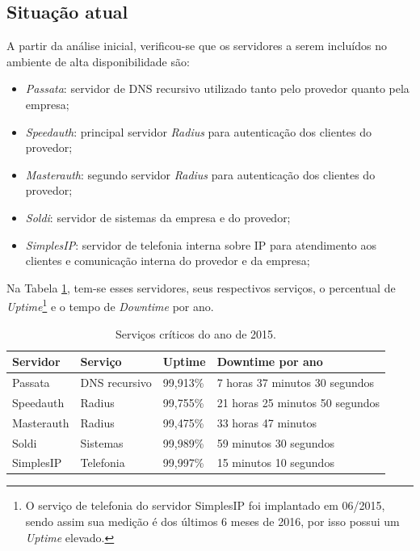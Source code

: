 \subsection{Situação atual}
\label{section:maqservcrit}

A partir da análise inicial, verificou-se que os servidores a serem incluídos no ambiente de alta disponibilidade são:
\begin{itemize}
 \item \textit{Passata}: servidor de \ac{DNS} recursivo utilizado tanto pelo provedor quanto pela empresa;
 \item \textit{Speedauth}: principal servidor \textit{Radius} para autenticação dos clientes do provedor;
 \item \textit{Masterauth}: segundo servidor \textit{Radius} para autenticação dos clientes do provedor;
 \item \textit{Soldi}: servidor de sistemas da empresa e do provedor;
 \item \textit{SimplesIP}: servidor de telefonia interna sobre \ac{IP} para atendimento aos clientes e comunicação interna do provedor e da empresa;
\end{itemize}

Na Tabela \ref{tab:dispservcrit}, tem-se esses servidores, seus respectivos serviços, o percentual de \textit{Uptime}\footnote[1]{O serviço de 
telefonia do servidor SimplesIP foi implantado em 06/2015, sendo assim sua medição é dos últimos 6 meses de 2016, por isso possui um 
\textit{Uptime} elevado.} e o tempo de \textit{Downtime} 
por ano. 

\begin{table}[h!]
\caption{Serviços críticos do ano de 2015.}
\label{tab:dispservcrit}
\begin{center}
\begin{tabular}{|l|l|l|l|}\hline
\textbf{Servidor} & \textbf{Serviço} & \textbf{Uptime} & \textbf{Downtime por ano} \\\hline
Passata & DNS recursivo & 99,913\% & 7 horas 37 minutos 30 segundos \\\hline
Speedauth & Radius & 99,755\% & 21 horas 25 minutos 50 segundos \\\hline
Masterauth & Radius & 99,475\% & 33 horas 47 minutos \\\hline
Soldi & Sistemas & 99,989\% & 59 minutos 30 segundos \\\hline
SimplesIP & Telefonia & 99,997\% & 15 minutos 10 segundos \\\hline %
\end{tabular}
\end{center}
\end{table}

